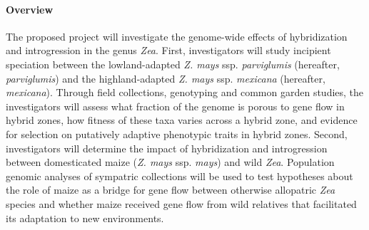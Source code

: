 
%
%
%
%
%
%

\paragraph{Overview} The proposed project will investigate the genome-wide effects of hybridization and introgression in the genus \emph{Zea}.  First, investigators will study  incipient speciation between the lowland-adapted \emph{Z. mays} ssp. \emph{parviglumis} (hereafter, \emph{parviglumis}) and the highland-adapted \emph{Z. mays} ssp. \emph{mexicana} (hereafter, \emph{mexicana}).  Through field collections, genotyping and common garden studies, the investigators will assess what fraction of the genome is porous to gene flow in hybrid zones, how fitness of these taxa varies across a hybrid zone, and evidence for selection on putatively adaptive phenotypic traits in hybrid zones. Second, investigators will determine the impact of hybridization and introgression between domesticated maize (\emph{Z. mays} ssp. \emph{mays}) and wild  \emph{Zea}. Population genomic analyses of sympatric collections will be used to test hypotheses about the role of maize as a bridge for gene flow between otherwise allopatric \emph{Zea} species and whether maize received gene flow from wild relatives that facilitated its adaptation to new environments.


